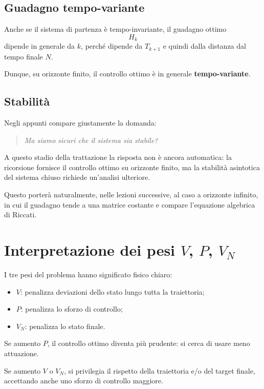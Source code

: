 \subsection{Guadagno tempo-variante}

Anche se il sistema di partenza è tempo-invariante, il guadagno ottimo
\[
H_k
\]
dipende in generale da \(k\), perché dipende da \(T_{k+1}\) e quindi
dalla distanza dal tempo finale \(N\).

Dunque, su orizzonte finito, il controllo ottimo è in generale \textbf{tempo-variante}.

\subsection{Stabilità}

Negli appunti compare giustamente la domanda:

\begin{quote}
\emph{Ma siamo sicuri che il sistema sia stabile?}
\end{quote}

A questo stadio della trattazione la risposta non è ancora automatica:
la ricorsione fornisce il controllo ottimo su orizzonte finito, ma la stabilità
asintotica del sistema chiuso richiede un'analisi ulteriore.

Questo porterà naturalmente, nelle lezioni successive, al caso a orizzonte infinito,
in cui il guadagno tende a una matrice costante e compare l'equazione algebrica di Riccati.

\section{Interpretazione dei pesi \(V\), \(P\), \(V_N\)}

I tre pesi del problema hanno significato fisico chiaro:
\begin{itemize}
    \item \(V\): penalizza deviazioni dello stato lungo tutta la traiettoria;
    \item \(P\): penalizza lo sforzo di controllo;
    \item \(V_N\): penalizza lo stato finale.
\end{itemize}

Se aumento \(P\), il controllo ottimo diventa più prudente:
si cerca di usare meno attuazione.

Se aumento \(V\) o \(V_N\), si privilegia il rispetto della traiettoria e/o del target finale,
accettando anche uno sforzo di controllo maggiore.

